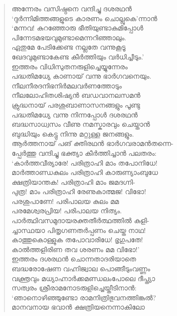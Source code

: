 \begin{verse}
അന്നേരം വസിഷ്ഠനെ വന്ദിച്ചു ദശരഥന്‍\\
‘ദുര്‍ന്നിമിത്തങ്ങളുടെ കാരണം ചൊല്ലുകെ’ന്നാന്‍\\
‘മന്നവ! കുറഞ്ഞോരു ഭീതിയുണ്ടാകുമിപ്പോള്‍\\
പിന്നേടമഭയവുമുണ്ടാമെന്നറിഞ്ഞാലും.\\
ഏതുമേ പേടിക്കേണ്ട നല്ലതേ വന്നുകൂടൂ\\
ഖേദവുമുണ്ടാകേണ്ട കീര്‍ത്തിയും വര്‍ധിച്ചീടും.’\\
ഇത്തരം വിധിസുതനരുളിച്ചെയ്യുന്നേരം\\
പദ്ധതിമധ്യേ കാണായ് വന്നു ഭാര്‍ഗവനെയും.\\
നീലനീരദനിഭനിര്‍മലവര്‍ണത്തോടും\\
നീലലോഹിതശിഷ്യന്‍ ബഡവാനലസമന്‍\\
ക്രുദ്ധനായ് പരശുബാണാസനങ്ങളും പൂണ്ടു\\
പദ്ധതിമധ്യേ വന്നു നിന്നപ്പോള്‍ ദശരഥന്‍\\
ബദ്ധസാധ്വസം വീണു നമസ്കാരവും ചെയ്താന്‍\\
ബുദ്ധിയും കെട്ടു നിന്നു മറ്റുള്ള ജനങ്ങളും.\\
ആര്‍ത്തനായ് പങ് ക്തിരഥന്‍ ഭാര്‍ഗവരാമന്‍തന്നെ-\\
പ്പേര്‍ത്തു വന്ദിച്ചു ഭക്ത്യാ കീര്‍ത്തിച്ചാന്‍ പലതരം:\\
‘കാര്‍ത്തവീര്യാരേ! പരിത്രാഹി മാം തപോനിധേ!\\
മാര്‍ത്താണ്ഡകുലം പരിത്രാഹി കാരുണ്യാംബുധേ\\
ക്ഷത്രിയാന്തക! പരിത്രാഹി മാം ജമദഗ്നി-\\
പുത്ര! മാം പരിത്രാഹി രേണുകാത്മജ! വിഭോ!\\
പരശുപാണേ! പരിപാലയ കുലം മമ\\
പരമേശ്വരപ്രിയ! പരിപാലയ നിത്യം.\\
പാര്‍ത്ഥിവസമുദായരക്തതീര്‍ത്ഥത്തില്‍ കുളി-\\
ച്ചാസ്ഥയാ പിതൃഗണതര്‍പ്പണം ചെയ്ത നാഥ!\\
കാത്തുകൊള്ളുക തപോവാരിധേ! ഭൃഗുപതേ!\\
കാല്‍ത്തളിരിണ തവ ശരണം മമ വിഭോ!’\\
ഇത്തരം ദശരഥന്‍ ചൊന്നതാദരിയാതെ\\
ബദ്ധരോഷേണ വഹ്നിജ്വാല പൊങ്ങീടുംവണ്ണം\\
വക്ത്രവും മധ്യാഹ്നാര്‍ക്കമണ്ഡലംപോലെ ദീപ്ത്യാ\\
സത്വരം ശ്രീരാമനോടരുളിച്ചെയ്തീടിനാന്‍:\\
‘ഞാനൊഴിഞ്ഞുണ്ടോ രാമനിത്രിഭുവനത്തിങ്കല്‍?\\
മാനവനായ ഭവാന്‍ ക്ഷത്രിയനെന്നാകിലോ\\

\end{verse}
